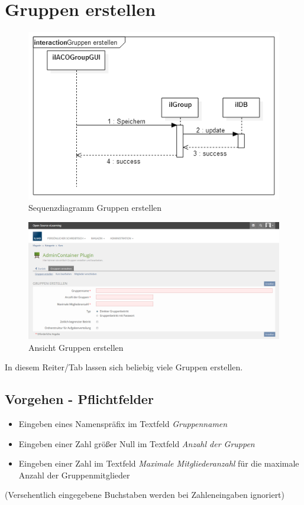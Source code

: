 \section{Gruppen erstellen}
\begin{figure}[h!]
	\centering
	\includegraphics[width=.75\textwidth]{img/seq_groupGUI.png}
	\caption{Sequenzdiagramm Gruppen erstellen}
\end{figure}
\begin{figure}[h!]
	\centering
	\includegraphics[width=1\textwidth]{img/gruppenErstellen.png}
	\caption{Ansicht Gruppen erstellen}
\end{figure}

In diesem Reiter/Tab lassen sich beliebig viele Gruppen erstellen. 
\newpage
\subsection*{Vorgehen - Pflichtfelder}

\begin{itemize}
	\item Eingeben eines Namenspräfix im Textfeld \textit{Gruppennamen} 
	\item Eingeben einer Zahl größer Null im Textfeld \textit{Anzahl der Gruppen}
	\item Eingeben einer Zahl im Textfeld \textit{Maximale Mitgliederanzahl} für die maximale Anzahl der Gruppenmitglieder 
\end{itemize}
(Versehentlich eingegebene Buchstaben werden bei Zahleneingaben ignoriert)




